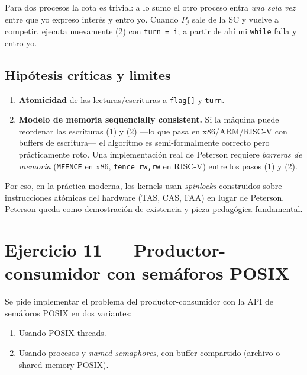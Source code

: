 \documentclass[11pt,a4paper]{article}
\begin{document}
Para dos procesos la cota es trivial: a lo sumo el otro proceso entra
\emph{una sola vez} entre que yo expreso interés y entro yo. Cuando
$P_j$ sale de la SC y vuelve a competir, ejecuta nuevamente (2) con
\texttt{turn = i}; a partir de ahí mi \texttt{while} falla y entro yo.

\subsection*{Hipótesis críticas y limites}

\begin{enumerate}[leftmargin=*,nosep]
    \item \textbf{Atomicidad} de las lecturas/escrituras a \texttt{flag[]}
        y \texttt{turn}.
    \item \textbf{Modelo de memoria sequencially consistent.} Si la
        máquina puede reordenar las escrituras (1) y (2) ---lo que pasa
        en x86/ARM/RISC-V con buffers de escritura--- el algoritmo es
        semi-formalmente correcto pero prácticamente roto. Una
        implementación real de Peterson requiere \emph{barreras de
        memoria} (\texttt{MFENCE} en x86, \texttt{fence rw,rw} en
        RISC-V) entre los pasos (1) y (2).
\end{enumerate}

Por eso, en la práctica moderna, los kernels usan \emph{spinlocks}
construidos sobre instrucciones atómicas del hardware (TAS, CAS, FAA)
en lugar de Peterson. Peterson queda como demostración de existencia y
pieza pedagógica fundamental.

\section{Ejercicio 11 --- Productor-consumidor con semáforos POSIX}

Se pide implementar el problema del productor-consumidor con la API de
semáforos POSIX en dos variantes:

\begin{enumerate}[leftmargin=*,nosep]
    \item Usando POSIX threads.
    \item Usando procesos y \emph{named semaphores}, con buffer compartido
        (archivo o shared memory POSIX).
\end{enumerate}
\end{document}
